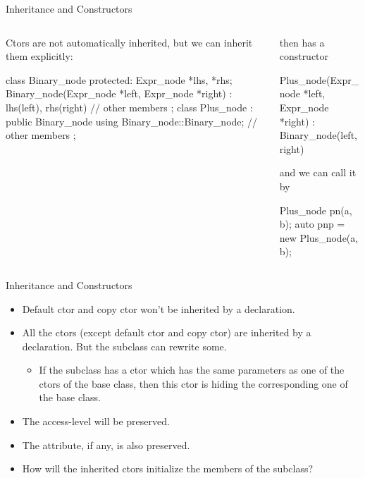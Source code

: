 \documentclass{beamer}
\begin{document}
\begin{frame}[fragile]{Inheritance and Constructors}
    \begin{columns}
        \begin{column}{0.6\linewidth}
            Ctors are not automatically inherited, but we can inherit them explicitly:
            \begin{cpp}
class Binary_node {
 protected:
  Expr_node *lhs, *rhs;
  Binary_node(Expr_node *left,
      Expr_node *right)
      : lhs(left), rhs(right) {}
  // other members
};
class Plus_node
    : public Binary_node {
  using Binary_node::Binary_node;
  // other members
};
            \end{cpp}
        \end{column}
        \begin{column}{0.5\linewidth}
            then  has a constructor
            \begin{cpp}
Plus_node(Expr_node *left, Expr_node *right)
  : Binary_node(left, right) {}
            \end{cpp}
            and we can call it by
            \begin{cpp}
Plus_node pn(a, b);
auto pnp
    = new Plus_node(a, b);
            \end{cpp}
        \end{column}
    \end{columns}
\end{frame}

\begin{frame}{Inheritance and Constructors}
    \begin{itemize}
        \item Default ctor and copy ctor won't be inherited by a  declaration. 
        \item All the ctors (except default ctor and copy ctor) are inherited by a  declaration. But the subclass can rewrite some.
        \begin{itemize}
            \item If the subclass has a ctor which has the same parameters as one of the ctors of the base class, then this ctor is hiding the corresponding one of the base class.
        \end{itemize}
        \item The access-level will be preserved. 
        \item The  attribute, if any, is also preserved.
        \item How will the inherited ctors initialize the members of the subclass?
    \end{itemize}
\end{frame}
\end{document}
